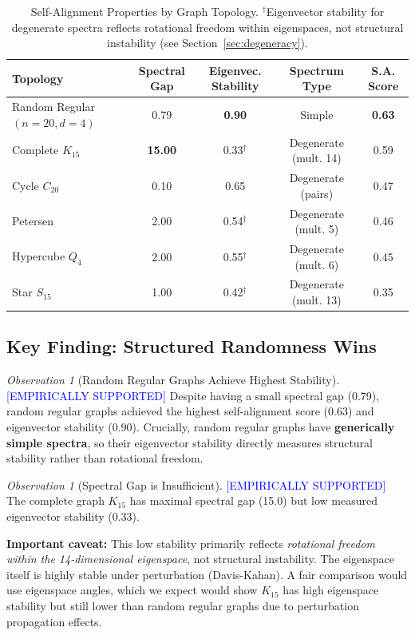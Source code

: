 \documentclass[11pt,a4paper]{article}
\theoremstyle{definition}
\theoremstyle{remark}
\newtheorem{observation}[theorem]{Observation}
\newcommand{\supported}{\textcolor{blue}{[EMPIRICALLY SUPPORTED]}}
\begin{document}
\begin{table}[h]
\centering
\caption{Self-Alignment Properties by Graph Topology. $^\dagger$Eigenvector stability for degenerate spectra reflects rotational freedom within eigenspaces, not structural instability (see Section~\ref{sec:degeneracy}).}
\label{tab:results}
\begin{tabular}{lcccc}
\toprule
\textbf{Topology} & \textbf{Spectral Gap} & \textbf{Eigenvec. Stability} & \textbf{Spectrum Type} & \textbf{S.A. Score} \\
\midrule
Random Regular $(n{=}20, d{=}4)$ & 0.79 & \textbf{0.90} & Simple & \textbf{0.63} \\
Complete $K_{15}$ & \textbf{15.00} & 0.33$^\dagger$ & Degenerate (mult. 14) & 0.59 \\
Cycle $C_{20}$ & 0.10 & 0.65 & Degenerate (pairs) & 0.47 \\
Petersen & 2.00 & 0.54$^\dagger$ & Degenerate (mult. 5) & 0.46 \\
Hypercube $Q_4$ & 2.00 & 0.55$^\dagger$ & Degenerate (mult. 6) & 0.45 \\
Star $S_{15}$ & 1.00 & 0.42$^\dagger$ & Degenerate (mult. 13) & 0.35 \\
\bottomrule
\end{tabular}
\end{table}

\subsection{Key Finding: Structured Randomness Wins}

\begin{observation}[Random Regular Graphs Achieve Highest Stability] \supported
\label{obs:random-regular}
Despite having a small spectral gap (0.79), random regular graphs achieved the highest self-alignment score (0.63) and eigenvector stability (0.90). Crucially, random regular graphs have \textbf{generically simple spectra}, so their eigenvector stability directly measures structural stability rather than rotational freedom.
\end{observation}

\begin{observation}[Spectral Gap is Insufficient] \supported
\label{obs:gap-insufficient}
The complete graph $K_{15}$ has maximal spectral gap (15.0) but low measured eigenvector stability (0.33). 

\textbf{Important caveat:} This low stability primarily reflects \emph{rotational freedom within the 14-dimensional eigenspace}, not structural instability. The eigenspace itself is highly stable under perturbation (Davis-Kahan). A fair comparison would use eigenspace angles, which we expect would show $K_{15}$ has high eigenspace stability but still lower than random regular graphs due to perturbation propagation effects.
\end{observation}
\end{document}
